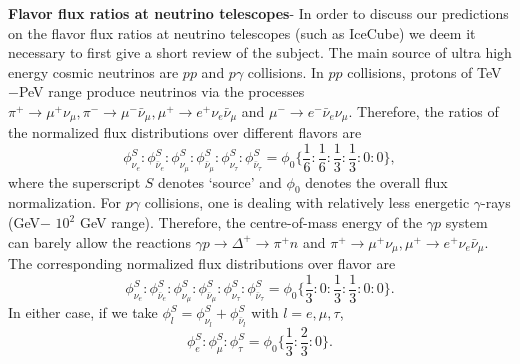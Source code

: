\documentclass[11pt]{article}
\begin{document}
\textbf{Flavor flux ratios at neutrino telescopes}- In order to discuss our predictions on the flavor flux ratios at neutrino telescopes (such as IceCube) we deem it necessary to first give a short review of the subject. The main source of ultra high energy cosmic neutrinos are $pp$ and $p\gamma$ collisions\cite{Gandhi:1995tf}. In  $pp$ collisions, protons of TeV$-$PeV range produce neutrinos via the processes $\pi^+\to \mu^+\nu_\mu, \pi^-\to \mu^-\bar{\nu}_\mu, \mu^{+}\to e^+\nu_e\bar{\nu}_\mu$ and $\mu^-\to e^{-}\bar{\nu}_e\nu_\mu.$ Therefore, the ratios of the normalized flux distributions over different flavors are \begin{equation}\phi^S_{\nu_e}:\phi^S_{\bar{\nu}_e}:\phi^S_{\nu_\mu}:\phi^S_{\bar{\nu}_\mu}:\phi^S_{\nu_\tau}:\phi^S_{\bar{\nu}_\tau}=\phi_0\Big\{\frac{1}{6}:\frac{1}{6}:\frac{1}{3}:\frac{1}{3}:0:0\Big\},\end{equation} where the superscript $S$ denotes `source' and $\phi_0$ denotes the overall flux normalization. For $p\gamma$ collisions, one is dealing with relatively less energetic $\gamma$-rays (GeV$-$ $10^2$ GeV range). Therefore, the centre-of-mass energy of the $\gamma p$ system can barely allow the reactions $\gamma p\to \Delta^+\to \pi^+ n$ and $\pi^+\to \mu^+\nu_\mu, \mu^+\to e^+\nu_e\bar{\nu}_\mu.$ The corresponding normalized flux distributions over flavor are\begin{equation}
\phi^S_{\nu_e}:\phi^S_{\bar{\nu}_e}:\phi^S_{\nu_\mu}:\phi^S_{\bar{\nu}_\mu}:\phi^S_{\nu_\tau}:\phi^S_{\bar{\nu}_\tau}=\phi_0\Big\{\frac{1}{3}:0:\frac{1}{3}:\frac{1}{3}:0:0\Big\}.\end{equation} In either case, if we take $\phi^S_l=\phi^S_{\nu_l}+\phi^S_{\bar{\nu}_l}$ with $l=e,\mu,\tau$, \begin{equation}
\phi_e^S:\phi_\mu^S:\phi_\tau^S=\phi_0\Big\{\frac{1}{3}:\frac{2}{3}:0\Big\}.\label{ratio}
\end{equation} 
\noindent
\end{document}
